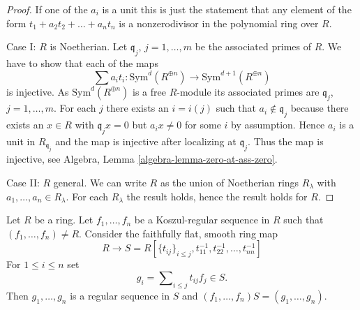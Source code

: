 \begin{proof}
If one of the $a_i$ is a unit this is just the statement that any
element of the form $t_1 + a_2 t_2 + \ldots + a_n t_n$ is a nonzerodivisor
in the polynomial ring over $R$.

\medskip\noindent
Case I: $R$ is Noetherian. Let $\mathfrak q_j$, $j = 1, \ldots, m$
be the associated primes of $R$. We have to show that
each of the maps
$$
\sum a_i t_i :
\text{Sym}^d(R^{\oplus n})
\longrightarrow
\text{Sym}^{d + 1}(R^{\oplus n})
$$
is injective. As $\text{Sym}^d(R^{\oplus n})$ is a free $R$-module its
associated primes are $\mathfrak q_j$, $j = 1, \ldots, m$. For each $j$
there exists an $i = i(j)$ such that $a_i \not \in \mathfrak q_j$ because
there exists an $x \in R$ with $\mathfrak q_jx = 0$ but $a_i x \not = 0$
for some $i$ by assumption. Hence $a_i$ is a unit in $R_{\mathfrak q_j}$
and the map is injective after localizing at $\mathfrak q_j$. Thus the map
is injective, see
Algebra, Lemma \ref{algebra-lemma-zero-at-ass-zero}.

\medskip\noindent
Case II: $R$ general. We can write $R$ as the union of Noetherian
rings $R_\lambda$ with $a_1, \ldots, a_n \in R_\lambda$. For each $R_\lambda$
the result holds, hence the result holds for $R$.
\end{proof}

\begin{lemma}
\label{lemma-Koszul-regular-flat-locally-regular}
Let $R$ be a ring. Let $f_1, \ldots, f_n$ be a Koszul-regular sequence
in $R$ such that $(f_1, \ldots, f_n) \not = R$.
Consider the faithfully flat, smooth ring map
$$
R \longrightarrow
S = R[\{t_{ij}\}_{i \leq j}, t_{11}^{-1}, t_{22}^{-1}, \ldots, t_{nn}^{-1}]
$$
For $1 \leq i \leq n$ set
$$
g_i = \sum\nolimits_{i \leq j} t_{ij} f_j \in S.
$$
Then $g_1, \ldots, g_n$ is a regular sequence in $S$ and
$(f_1, \ldots, f_n)S = (g_1, \ldots, g_n)$.
\end{lemma}

